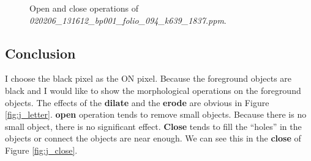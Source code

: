 \documentclass[paper=a4, fontsize=11pt]{scrartcl}
\numberwithin{equation}{section}		%
\numberwithin{figure}{section}			%
\numberwithin{table}{section}				%
\begin{document}
\begin{figure}
\centering
{}
\caption{Open and close operations of \emph{020206\_131612\_bp001\_folio\_094\_k639\_1837.ppm}.}
\label{fig:morph:02}
\end{figure}

\subsection{Conclusion}

I choose the black pixel as the ON pixel.
Because the foreground objects are black and I would like to show the morphological operations on the foreground objects.
The effects of the \textbf{dilate} and the \textbf{erode} are obvious in Figure \ref{fig:j_letter}.
\textbf{open} operation tends to remove small objects.
Because there is no small object, there is no significant effect.
\textbf{Close} tends to fill the ``holes'' in the objects or connect the objects are near enough.
We can see this in the \textbf{close} of Figure \ref{fig:j_close}.
\end{document}
